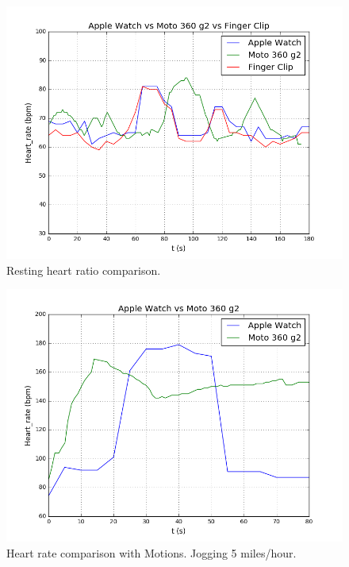 \documentclass[11pt, draftclsnofoot, onecolumn]{IEEEtran}
\begin{document}
    \begin{figure}[h]	
        \centering
        \includegraphics[scale=0.50]{heart_rate_apple_steady} 
        \caption{Resting heart ratio comparison.}
        \label{fig:HeartRateComSteady}
    \end{figure}
    
    \begin{figure}[h]	
        \centering
        \includegraphics[scale=0.50]{heart_rate_apple_move}
        \caption{Heart rate comparison with Motions. Jogging 5 miles/hour.}
        \label{fig:HeartRateComMove}
    \end{figure}
    
\end{document}
